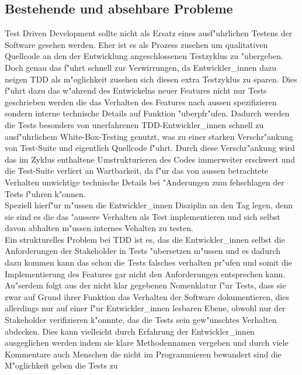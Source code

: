 \documentclass[runningheads,a4paper]{llncs}
\begin{document}
  \subsection{Bestehende und absehbare Probleme}
    Test Driven Development sollte nicht als Ersatz eines ausf"uhrlichen Testens
    der Software gesehen werden. Eher ist es als Prozess zusehen um qualitativen
    Quellcode an den der Entwicklung angeschlossenen Testzyklus zu "ubergeben.\\
    Doch genau das f"uhrt schnell zur Verwirrungen, da Entwickler\_innen dazu
    neigen TDD als m"oglichkeit zusehen sich diesen extra Testzyklus zu sparen.
    Dies f"uhrt dazu das w"ahrend des Entwickelns neuer Features nicht nur 
    Tests geschrieben werden die das Verhalten des Features nach aussen spezifizieren
    sondern interne technische Details auf Funktion "uberpfr"ufen. Dadurch werden
    die Tests besonders von unerfahrenen TDD-Entwickler\_innen schnell zu 
    ausf"uhrlichem White-Box-Testing genutzt, was zu einer starken Verschr"ankung
    von Test-Suite und eigentlich Quellcode f"uhrt. Durch diese Verschr"ankung
    wird das im Zyklus enthaltene Umstrukturieren des Codes immerweiter 
    erschwert und die Test-Suite verliert an Wartbarkeit, da f"ur das von aussen
    betrachtete Verhalten unwichtige technische Details bei "Anderungen zum 
    fehschlagen der Tests f"uhren k"onnen.\\
    Speziell hierf"ur m"ussen die Entwickler\_innen Disziplin an den Tag legen,
    denn sie sind es die das "aussere Verhalten als Test implementieren und sich
    selbst davon abhalten m"ussen internes Vehalten zu testen.\\
    Ein strukturelles Problem bei TDD ist es, das die Entwickler\_innen selbst
    die Anforderungen der Stakeholder in Tests "ubersetzen m"ussen und es 
    dadurch dazu kommen kann das schon die Tests falsches verhalten pr"ufen
    und somit die Implementierung des Features gar nicht den Anforderungen 
    entsprechen kann. Au"serdem folgt aus der nicht klar gegebenen Nomenklatur
    f"ur Tests, dass sie zwar auf Grund ihrer Funktion das Verhalten der 
    Software dokumentieren, dies allerdings nur auf einer f"ur Entwickler\_innen
    lesbaren Ebene, obwohl nur der Stakeholder verifizieren k"onnnte, das die 
    Tests sein gew"unschtes Verhalten abdecken. Dies kann vielleicht durch 
    Erfahrung der Entwickler\_innen ausgeglichen werden indem sie klare 
    Methodennamen vergeben und durch viele Kommentare auch Menschen die nicht 
    im Programmieren bewandert sind die M"oglichkeit geben die Tests zu 
\end{document}
